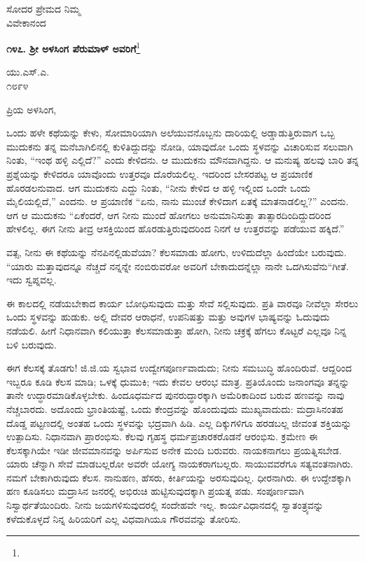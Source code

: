 \vspace{-0.4cm}

{\flushright
ಸೋದರ ಪ್ರೇಮದ ನಿಮ್ಮ\\ವಿವೇಕಾನಂದ\par}

\begin{center}
\textbf{೧೪೭. ಶ‍್ರೀ ಅಳಸಿಂಗ ಪೆರುಮಾಳ್ ಅವರಿಗೆ}\footnote{}
\end{center}

\vspace{-0.6cm}

\begin{flushright}
ಯು.ಎಸ್.ಎ.\\೧೮೯೪
\end{flushright}

\vspace{-0.5cm}

\noindent
ಪ್ರಿಯ ಅಳಸಿಂಗ,

ಒಂದು ಹಳೇ ಕಥೆಯನ್ನು ಕೇಳು, ಸೋಮಾರಿಯಾಗಿ ಅಲೆಯುವನೊಬ್ಬನು ದಾರಿಯಲ್ಲಿ ಅಡ್ಡಾಡುತ್ತಿರುವಾಗ ಒಬ್ಬ ಮುದುಕನು ತನ್ನ ಮನೆಬಾಗಿಲಿನಲ್ಲಿ ಕುಳಿತಿದ್ದುದನ್ನು ನೋಡಿ, ಯಾವುದೋ ಒಂದು ಸ್ಥಳವನ್ನು ವಿಚಾರಿಸುವ ಸಲುವಾಗಿ ನಿಂತು, “ಇಂಥ ಹಳ್ಳಿ ಎಲ್ಲಿದೆ?” ಎಂದು ಕೇಳಿದನು. ಆ ಮುದುಕನು ಮೌನವಾಗಿದ್ದನು. ಆ ಮನುಷ್ಯ ಹಲವು ಬಾರಿ ತನ್ನ ಪ್ರಶ್ನೆಯನ್ನು ಕೇಳಿದರೂ ಯಾವೊಂದು ಉತ್ತರವೂ ದೊರೆಯಲಿಲ್ಲ. ಇದರಿಂದ ಬೇಸರಪಟ್ಟ ಆ ಪ್ರಯಾಣಿಕ ಹೊರಡಲನುವಾದ. ಆಗ ಮುದುಕನು ಎದ್ದು ನಿಂತು, “ನೀನು ಕೇಳಿದ ಆ ಹಳ್ಳಿ ಇಲ್ಲಿಂದ ಒಂದೇ ಒಂದು ಮೈಲಿಯಲ್ಲಿದೆ,” ಎಂದನು. ಆ ಪ್ರಯಾಣಿಕ “ಏನು, ನಾನು ಮುಂಚೆ ಕೇಳಿದಾಗ ಏತಕ್ಕೆ ಮಾತನಾಡಲಿಲ್ಲ?” ಎಂದನು. ಆಗ ಆ ಮುದುಕನು “ಏಕೆಂದರೆ, ಆಗ ನೀನು ಮುಂದೆ ಹೋಗಲು ಅನುಮಾನಿಸುತ್ತಾ ತಾತ್ಸಾರದಿಂದಿದ್ದುದರಿಂದ ಹೇಳಲಿಲ್ಲ. ಈಗ ನೀನು ತೀವ್ರ ಆಸಕ್ತಿಯಿಂದ ಹೊರಡುತ್ತಿರುವುದರಿಂದ ನಿನಗೆ ಆ ಉತ್ತರವನ್ನು ಪಡೆಯುವ ಹಕ್ಕಿದೆ.”

ವತ್ಸ, ನೀನು ಈ ಕಥೆಯನ್ನು ನೆನಪಿನಲ್ಲಿಡುವೆಯಾ? ಕೆಲಸಮಾಡು ಹೋಗು, ಉಳಿದುದೆಲ್ಲಾ ಹಿಂದೆಯೇ ಬರುವುದು. “ಯಾರು ಮತ್ತಾವುದನ್ನೂ ನೆಚ್ಚದೆ ನನ್ನನ್ನೇ ನಂಬಿರುವರೋ ಅವರಿಗೆ ಬೇಕಾದುದನ್ನೆಲ್ಲಾ ನಾನೇ ಒದಗಿಸುವೆನು“\enginline{-}ಗೀತೆ. ಇದು ಸ್ವಪ್ನವಲ್ಲ.

ಈ ಕಾಲದಲ್ಲಿ ನಡೆಯಬೇಕಾದ ಕಾರ್ಯ ಬೋಧಿಸುವುದು ಮತ್ತು ಸೇವೆ ಸಲ್ಲಿಸುವುದು. ಪ್ರತಿ ವಾರವೂ ನೀವೆಲ್ಲಾ ಸೇರಲು ಒಂದು ಸ್ಥಳವನ್ನು ಹುಡುಕು. ಅಲ್ಲಿ ದೇವರ ಆರಾಧನೆ, ಉಪನಿಷತ್ತು ಮತ್ತು ಅವುಗಳ ಭಾಷ್ಯವನ್ನು ಓದುವುದು ನಡೆಯಲಿ. ಹೀಗೆ ನಿಧಾನವಾಗಿ ಕಲಿಯುತ್ತಾ ಕೆಲಸಮಾಡುತ್ತಾ ಹೋಗಿ, ನೀನು ಚಕ್ರಕ್ಕೆ ಹೆಗಲು ಕೊಟ್ಟರೆ ಎಲ್ಲವೂ ನಿನ್ನ ಬಳಿ ಬರುವುದು.

ಈಗ ಕೆಲಸಕ್ಕೆ ತೊಡಗು! ಜಿ.ಜಿ.ಯ ಸ್ವಭಾವ ಉದ್ವೇಗಪೂರ್ಣವಾದುದು; ನೀನು ಸಮಬುದ್ಧಿ ಹೊಂದಿರುವೆ. ಆದ್ದರಿಂದ ಇಬ್ಬರೂ ಕೂಡಿ ಕೆಲಸ ಮಾಡಿ; ಒಳಕ್ಕೆ ಧುಮುಕಿ; ಇದು ಕೇವಲ ಆರಂಭ ಮಾತ್ರ. ಪ್ರತಿಯೊಂದು ಜನಾಂಗವೂ ತನ್ನನ್ನು ತಾನೇ ಉದ್ಧಾರಮಾಡಿಕೊಳ್ಳಬೇಕು. ಹಿಂದೂಧರ್ಮದ ಪುನರುದ್ಧಾರಕ್ಕಾಗಿ ಅಮೆರಿಕಾದಿಂದ ಬರುವ ಹಣವನ್ನು ನಾವು ನೆಚ್ಚಬಾರದು. ಅದೊಂದು ಭ್ರಾಂತಿಯಷ್ಟೆ, ಒಂದು ಕೇಂದ್ರವನ್ನು ಹೊಂದುವುದು ಮುಖ್ಯವಾದುದು: ಮದ್ರಾಸಿನಂತಹ ದೊಡ್ಡ ಪಟ್ಟಣದಲ್ಲಿ ಅಂತಹ ಒಂದು ಸ್ಥಳವನ್ನು ಭದ್ರವಾಗಿ ಹಿಡಿ. ಎಲ್ಲ ದಿಕ್ಕುಗಳಿಗೂ ಹರಡಬಲ್ಲ ಜೀವಂತ ಶಕ್ತಿಯನ್ನು ಉತ್ಪಾದಿಸು. ನಿಧಾನವಾಗಿ ಪ್ರಾರಂಭಿಸು. ಕೆಲವು ಗೃಹಸ್ಥ ಧರ್ಮಪ್ರಚಾರಕರೊಡನೆ ಆರಂಭಿಸು. ಕ್ರಮೇಣ ಈ ಕೆಲಸಕ್ಕಾಗಿಯೇ ಇಡೀ ಜೀವಮಾನವನ್ನು ಅರ್ಪಿಸುವ ಅನೇಕ ಮಂದಿ ಬರುವರು. ನಾಯಕನಾಗಲು ಪ್ರಯತ್ನಿಸಬೇಡ. ಯಾರು ಚೆನ್ನಾಗಿ ಸೇವೆ ಮಾಡಬಲ್ಲರೋ ಅವರೇ ಯೋಗ್ಯ ನಾಯಕರಾಗಬಲ್ಲರು. ಸಾಯುವವರೆಗೂ ಸತ್ಯವಂತನಾಗಿರು. ನಮಗೆ ಬೇಕಾಗಿರುವುದು ಕೆಲಸ. ನಾನುಹಣ, ಹೆಸರು, ಕೀರ್ತಿಯನ್ನು ಅರಸುವುದಿಲ್ಲ. ಧೀರನಾಗಿರು. ಈ ಉದ್ದೇಶಕ್ಕಾಗಿ ಹಣ ಕೂಡಿಸಲು ಮದ್ರಾಸಿನ ಜನರಲ್ಲಿ ಅಭಿರುಚಿ ಹುಟ್ಟಿಸುವುದಕ್ಕಾಗಿ ಪ್ರಯತ್ನ ಪಡು. ಸಂಪೂರ್ಣವಾಗಿ ನಿಸ್ವಾರ್ಥತೆಯಿಂದಿರು. ನೀನು ಜಯಗಳಿಸುವುದರಲ್ಲಿ ಸಂದೇಹವೇ ಇಲ್ಲ. ಕಾರ್ಯವಿಧಾನದಲ್ಲಿ ಸ್ವಾತಂತ್ರ್ಯವನ್ನು ಕಳೆದುಕೊಳ್ಳದೆ ನಿನ್ನ ಹಿರಿಯರಿಗೆ ಎಲ್ಲ ವಿಧವಾಗಿಯೂ ಗೌರವವನ್ನು ತೋರಿಸು.

